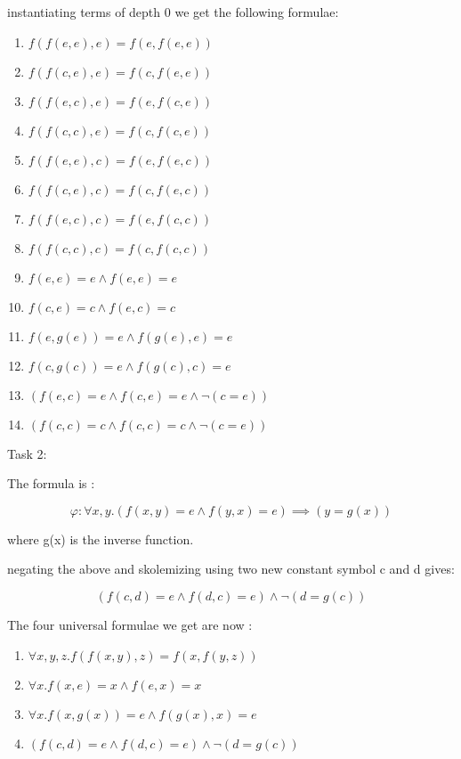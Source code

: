 \documentclass[12pt]{article}
\begin{document}
instantiating terms of depth 0 we get the following formulae:
\begin{enumerate}
    \item $f(f(e,e),e) = f(e,f(e,e))$
    \item $f(f(c,e),e) = f(c,f(e,e))$
    \item $f(f(e,c),e) = f(e,f(c,e))$
    \item $f(f(c,c),e) = f(c,f(c,e))$
    \item $f(f(e,e),c) = f(e,f(e,c))$
    \item $f(f(c,e),c) = f(c,f(e,c))$
    \item $f(f(e,c),c) = f(e,f(c,c))$
    \item $f(f(c,c),c) = f(c,f(c,c))$
    \item $f(e,e) = e \land f(e,e) = e$
    \item $f(c,e) = c \land f(e,c) = c$
    \item $f(e , g(e)) = e \land f(g(e),e) = e$
    \item $f(c , g(c)) = e \land f(g(c),c) = e$
    \item $(f(e,c) = e \land f(c,e) = e \land \neg (c = e))$
    \item $(f(c,c) = c \land f(c,c) = c \land \neg (c = e))$
\end{enumerate}

\noindent Task 2:

The formula is :

\begin {equation}
\varphi : \forall x, y. (f(x,y) = e \land f(y,x) = e) \implies (y = g(x))
\end {equation}

where g(x) is the inverse function.

negating the above and skolemizing using two new constant symbol c and d gives:

$$(f(c,d) = e \land f(d,c) = e) \land \neg(d = g(c))$$

The four universal formulae we get are now :

\begin{enumerate}
    \item $\forall x,y,z. f(f(x,y),z) = f(x,f(y,z))$
    \item $\forall x. f(x,e) = x \land f(e,x) = x$
    \item $\forall x. f(x , g(x)) = e \land f(g(x),x) = e$
    \item $(f(c,d) = e \land f(d,c) = e) \land \neg(d = g(c))$
\end{enumerate}
\end{document}
